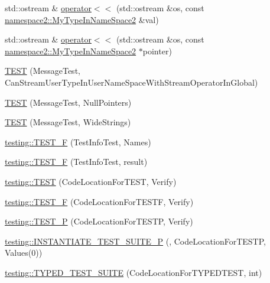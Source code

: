\begin{DoxyCompactItemize}
std\+::ostream \& \mbox{\hyperlink{googletest-master_2googletest_2test_2gtest__unittest_8cc_ab3cbb7adaeba5049e2c1907523f0c3e8}{operator$<$$<$}} (std\+::ostream \&os, const \mbox{\hyperlink{classnamespace2_1_1_my_type_in_name_space2}{namespace2\+::\+My\+Type\+In\+Name\+Space2}} \&val)
\item 
std\+::ostream \& \mbox{\hyperlink{googletest-master_2googletest_2test_2gtest__unittest_8cc_a839d8a189a0c52bb7899a5b4b4b07ed1}{operator$<$$<$}} (std\+::ostream \&os, const \mbox{\hyperlink{classnamespace2_1_1_my_type_in_name_space2}{namespace2\+::\+My\+Type\+In\+Name\+Space2}} $\ast$pointer)
\item 
\mbox{\hyperlink{googletest-master_2googletest_2test_2gtest__unittest_8cc_ad2b886ecfee880b5012c8d41b448f110}{T\+E\+ST}} (Message\+Test, Can\+Stream\+User\+Type\+In\+User\+Name\+Space\+With\+Stream\+Operator\+In\+Global)
\item 
\mbox{\hyperlink{googletest-master_2googletest_2test_2gtest__unittest_8cc_a94b1c12b49eabc12e7418733576df02a}{T\+E\+ST}} (Message\+Test, Null\+Pointers)
\item 
\mbox{\hyperlink{googletest-master_2googletest_2test_2gtest__unittest_8cc_a9c9e67e24350d636fa355b36ed230706}{T\+E\+ST}} (Message\+Test, Wide\+Strings)
\item 
\mbox{\hyperlink{namespacetesting_acd53db89097aba1468724d6446069b1e}{testing\+::\+T\+E\+S\+T\+\_\+F}} (Test\+Info\+Test, Names)
\item 
\mbox{\hyperlink{namespacetesting_ab00e29c00b3e29cdfa21d23b79dd3776}{testing\+::\+T\+E\+S\+T\+\_\+F}} (Test\+Info\+Test, result)
\item 
\mbox{\hyperlink{namespacetesting_af597d0ad4de0197141b78e9c1035e491}{testing\+::\+T\+E\+ST}} (Code\+Location\+For\+T\+E\+ST, Verify)
\item 
\mbox{\hyperlink{namespacetesting_a782ec43081903a0aaa6d009218eba2a8}{testing\+::\+T\+E\+S\+T\+\_\+F}} (Code\+Location\+For\+T\+E\+S\+TF, Verify)
\item 
\mbox{\hyperlink{namespacetesting_af05768b7e2f14652d2c4f274ba1a5544}{testing\+::\+T\+E\+S\+T\+\_\+P}} (Code\+Location\+For\+T\+E\+S\+TP, Verify)
\item 
\mbox{\hyperlink{namespacetesting_a91b2d3c4e8c89bcec13270ae8585d549}{testing\+::\+I\+N\+S\+T\+A\+N\+T\+I\+A\+T\+E\+\_\+\+T\+E\+S\+T\+\_\+\+S\+U\+I\+T\+E\+\_\+P}} (, Code\+Location\+For\+T\+E\+S\+TP, Values(0))
\item 
\mbox{\hyperlink{namespacetesting_a47a357ed1077c1b52ba654b7753714bc}{testing\+::\+T\+Y\+P\+E\+D\+\_\+\+T\+E\+S\+T\+\_\+\+S\+U\+I\+TE}} (Code\+Location\+For\+T\+Y\+P\+E\+D\+T\+E\+ST, int)

\end{DoxyCompactItemize}
